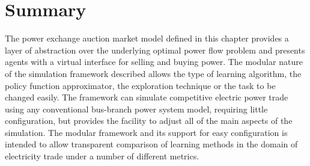 \section{Summary}
The power exchange auction market model defined in this chapter provides a
layer of abstraction over the underlying optimal power flow problem and
presents agents with a virtual interface for selling
and buying power.  The modular nature of the simulation framework described
allows the type of learning algorithm, the policy function approximator,
the exploration technique or the task to be changed easily. The framework
can simulate competitive electric power trade using any conventional bus-branch
power system model, requiring little configuration, but provides the facility
to adjust all of the main aspects of the simulation. The modular framework and
its support for easy configuration is intended to allow transparent comparison
of learning methods in the domain of electricity trade under a number of
different metrics.
